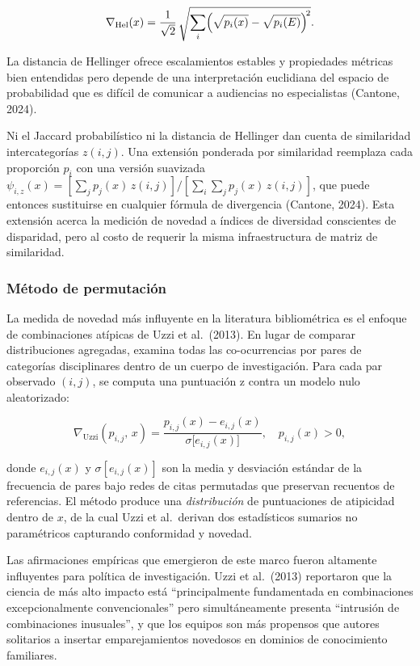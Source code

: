 \documentclass[
]{article}
\begin{document}
\[\nabla_{\mathrm{Hel}}(x) = \frac{1}{\sqrt{2}}\,\sqrt{\sum_i \Bigl(
\sqrt{p_i(x)} - \sqrt{p_i(E)}\Bigr)^{\!2}}.\]

La distancia de Hellinger ofrece escalamientos estables y propiedades
métricas bien entendidas pero depende de una interpretación euclidiana
del espacio de probabilidad que es difícil de comunicar a audiencias no
especialistas (Cantone, 2024).

Ni el Jaccard probabilístico ni la distancia de Hellinger dan cuenta de
similaridad intercategorías \(z(i,j)\). Una extensión ponderada por
similaridad reemplaza cada proporción \(p_i\) con una versión suavizada
\(\psi_{i,z}(x) = [\sum_j p_j(x)\,z(i,j)] / [\sum_i \sum_j p_j(x)\,z(i,j)]\),
que puede entonces sustituirse en cualquier fórmula de divergencia
(Cantone, 2024). Esta extensión acerca la medición de novedad a índices
de diversidad conscientes de disparidad, pero al costo de requerir la
misma infraestructura de matriz de similaridad.

\hypertarget{muxe9todo-de-permutaciuxf3n}{%
\subsubsection{Método de
permutación}\label{muxe9todo-de-permutaciuxf3n}}

La medida de novedad más influyente en la literatura bibliométrica es el
enfoque de combinaciones atípicas de Uzzi et al.~(2013). En lugar de
comparar distribuciones agregadas, examina todas las co-ocurrencias por
pares de categorías disciplinares dentro de un cuerpo de investigación.
Para cada par observado \((i,j)\), se computa una puntuación z contra un
modelo nulo aleatorizado:

\[\nabla_{\mathrm{Uzzi}}(p_{i,j},\, x) = \frac{p_{i,j}(x) - e_{i,j}(x)}
{\sigma\!\bigl[e_{i,j}(x)\bigr]}, \quad p_{i,j}(x) > 0,\]

donde \(e_{i,j}(x)\) y \(\sigma[e_{i,j}(x)]\) son la media y desviación
estándar de la frecuencia de pares bajo redes de citas permutadas que
preservan recuentos de referencias. El método produce una
\emph{distribución} de puntuaciones de atipicidad dentro de \(x\), de la
cual Uzzi et al.~derivan dos estadísticos sumarios no paramétricos
capturando conformidad y novedad.

Las afirmaciones empíricas que emergieron de este marco fueron altamente
influyentes para política de investigación. Uzzi et al.~(2013)
reportaron que la ciencia de más alto impacto está ``principalmente
fundamentada en combinaciones excepcionalmente convencionales'' pero
simultáneamente presenta ``intrusión de combinaciones inusuales'', y que
los equipos son más propensos que autores solitarios a insertar
emparejamientos novedosos en dominios de conocimiento familiares.
\end{document}
